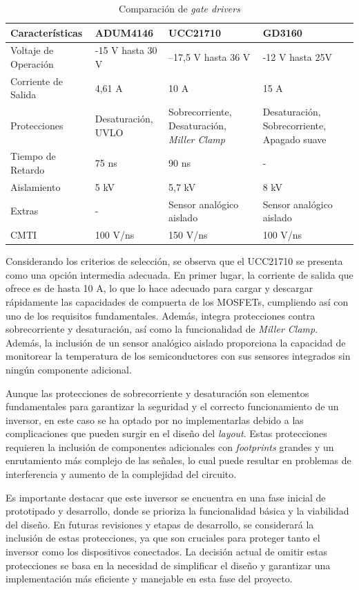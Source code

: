 \begin{table}[H]
	\centering
	\begin{tabular}{|l|p{3.5cm}|p{3.5cm}|p{3.5cm}|}
		\hline
		\textbf{Características} & \textbf{ADUM4146} & \textbf{UCC21710} & \textbf{GD3160} \\
		\hline
		Voltaje de Operación & -15 V hasta 30 V & –17,5 V hasta 36 V & -12 V hasta 25V \\
		\hline
		Corriente de Salida & 4,61 A & 10 A & 15 A \\
		\hline
		Protecciones & Desaturación, UVLO & Sobrecorriente, Desaturación, \textit{Miller Clamp} & Desaturación, Sobrecorriente, Apagado suave \\
		\hline
		Tiempo de Retardo & 75 ns & 90 ns & - \\
		\hline
		Aislamiento & 5 kV & 5,7 kV & 8 kV \\
		\hline
		Extras & - & Sensor analógico aislado & Sensor analógico aislado \\
		\hline
		CMTI & 100 V/ns & 150 V/ns & 100 V/ns \\
		\hline
	\end{tabular}
	\caption{Comparación de \textit{gate drivers}}
\end{table}

Considerando los criterios de selección, se observa que el UCC21710 se presenta como una opción intermedia adecuada. En primer lugar, la corriente de salida que ofrece es de hasta 10 A, lo que lo hace adecuado para cargar y descargar rápidamente las capacidades de compuerta de los MOSFETs, cumpliendo así con uno de los requisitos fundamentales. Además, integra protecciones contra sobrecorriente y desaturación, así como la funcionalidad de \textit{Miller Clamp}. Además, la inclusión de un sensor analógico aislado proporciona la capacidad de monitorear la temperatura de los semiconductores con sus sensores integrados sin ningún componente adicional.

Aunque las protecciones de sobrecorriente y desaturación son elementos fundamentales para garantizar la seguridad y el correcto funcionamiento de un inversor, en este caso se ha optado por no implementarlas debido a las complicaciones que pueden surgir en el diseño del \textit{layout}. Estas protecciones requieren la inclusión de componentes adicionales con \textit{footprints} grandes y un enrutamiento más complejo de las señales, lo cual puede resultar en problemas de interferencia y aumento de la complejidad del circuito.

Es importante destacar que este inversor se encuentra en una fase inicial de prototipado y desarrollo, donde se prioriza la funcionalidad básica y la viabilidad del diseño. En futuras revisiones y etapas de desarrollo, se considerará la inclusión de estas protecciones, ya que son cruciales para proteger tanto el inversor como los dispositivos conectados. La decisión actual de omitir estas protecciones se basa en la necesidad de simplificar el diseño y garantizar una implementación más eficiente y manejable en esta fase del proyecto.

